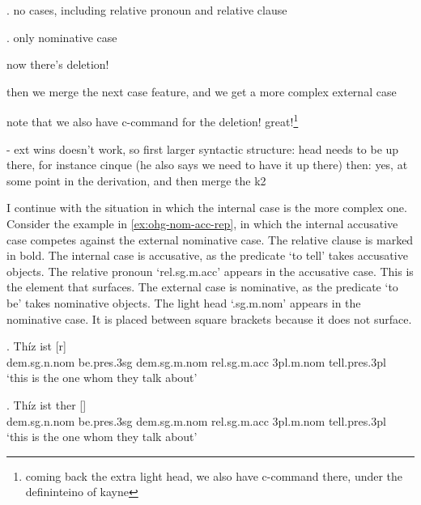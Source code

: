 \ex. no cases, including relative pronoun and relative clause

\ex. only nominative case

now there's deletion!

then we merge the next case feature, and we get a more complex external case

note that we also have c-command for the deletion! great!\footnote{
coming back the extra light head, we also have c-command there, under the defininteino of kayne
}





- ext wins doesn't work, so first larger syntactic structure: head needs to be up there, for instance cinque (he also says we need to have it up there)
then: yes, at some point in the derivation, and then merge the k2




I continue with the situation in which the internal case is the more complex one.
Consider the example in \ref{ex:ohg-nom-acc-rep}, in which the internal accusative case competes against the external nominative case. The relative clause is marked in bold.
The internal case is accusative, as the predicate  `to tell' takes accusative objects. The relative pronoun  `\ac{rel}.\ac{sg}.\ac{m}.\ac{acc}' appears in the accusative case. This is the element that surfaces.
The external case is nominative, as the predicate  `to be' takes nominative objects. The light head  `.\ac{sg}.\ac{m}.\ac{nom}' appears in the nominative case. It is placed between square brackets because it does not surface.

\exg. Thíz ist [r]   \\
\ac{dem}.\ac{sg}.\ac{n}.\ac{nom} be.\ac{pres}.3\ac{sg}\scsub{[nom]} \ac{dem}.\ac{sg}.\ac{m}.\ac{nom} \ac{rel}.\ac{sg}.\ac{m}.\ac{acc} 3\ac{pl}.\ac{m}.\ac{nom} tell.\ac{pres}.3\ac{pl}\scsub{[acc]}\\
`this is the one whom they talk about' \label{ex:ohg-nom-acc-rep}

\exg. Thíz ist ther []  \\
\ac{dem}.\ac{sg}.\ac{n}.\ac{nom} be.\ac{pres}.3\ac{sg}\scsub{[nom]} \ac{dem}.\ac{sg}.\ac{m}.\ac{nom} \ac{rel}.\ac{sg}.\ac{m}.\ac{acc} 3\ac{pl}.\ac{m}.\ac{nom} tell.\ac{pres}.3\ac{pl}\scsub{[acc]}\\
`this is the one whom they talk about' \label{ex:ohg-nom-acc-rep}

